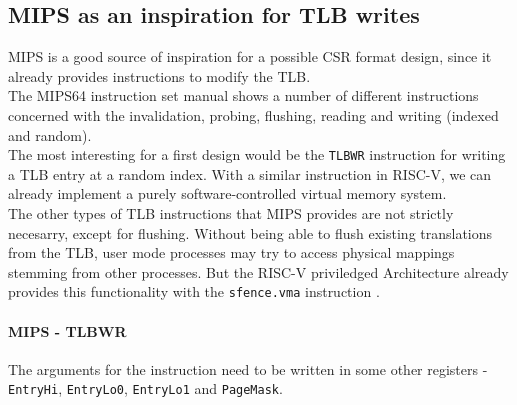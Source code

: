 \subsection{MIPS as an inspiration for TLB writes}
MIPS is a good source of inspiration for a possible CSR format design, since it already provides
instructions to modify the TLB.\\
The MIPS64 instruction set manual \cite{MIPSArchitectureProgrammers2016}
shows a number of different instructions concerned with the invalidation, probing, flushing, reading
and writing (indexed and random).\\
The most interesting for a first design would be the \texttt{TLBWR} instruction for writing a TLB
entry at a random index. With a similar instruction in RISC-V, we can already implement a purely
software-controlled virtual memory system.\\
The other types of TLB instructions that MIPS provides are not strictly necesarry,
except for flushing. Without being able to flush existing translations from the TLB,
user mode processes may try to access physical mappings stemming from other processes.
But the RISC-V priviledged Architecture already provides this functionality
with the \texttt{sfence.vma} instruction \cite{riscvreader}.

\paragraph{MIPS - TLBWR} The arguments for the instruction need to be written in some
other registers - \texttt{EntryHi}, \texttt{EntryLo0}, \texttt{EntryLo1} and \texttt{PageMask}.








